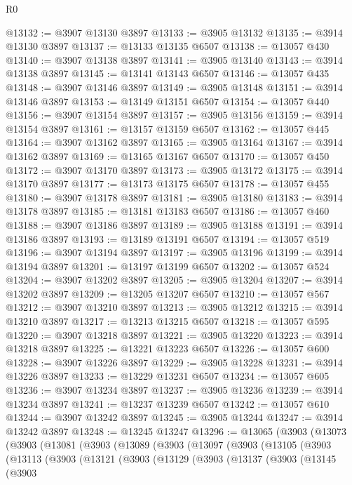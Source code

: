 \begin{lexlean}{R0}
\begin{coremodule}
@13132 := @3907 @13130 @3897
@13133 := @3905 @13132
@13135 := @3914 @13130 @3897
@13137 := @13133 @13135 @6507
@13138 := @13057 @430
@13140 := @3907 @13138 @3897
@13141 := @3905 @13140
@13143 := @3914 @13138 @3897
@13145 := @13141 @13143 @6507
@13146 := @13057 @435
@13148 := @3907 @13146 @3897
@13149 := @3905 @13148
@13151 := @3914 @13146 @3897
@13153 := @13149 @13151 @6507
@13154 := @13057 @440
@13156 := @3907 @13154 @3897
@13157 := @3905 @13156
@13159 := @3914 @13154 @3897
@13161 := @13157 @13159 @6507
@13162 := @13057 @445
@13164 := @3907 @13162 @3897
@13165 := @3905 @13164
@13167 := @3914 @13162 @3897
@13169 := @13165 @13167 @6507
@13170 := @13057 @450
@13172 := @3907 @13170 @3897
@13173 := @3905 @13172
@13175 := @3914 @13170 @3897
@13177 := @13173 @13175 @6507
@13178 := @13057 @455
@13180 := @3907 @13178 @3897
@13181 := @3905 @13180
@13183 := @3914 @13178 @3897
@13185 := @13181 @13183 @6507
@13186 := @13057 @460
@13188 := @3907 @13186 @3897
@13189 := @3905 @13188
@13191 := @3914 @13186 @3897
@13193 := @13189 @13191 @6507
@13194 := @13057 @519
@13196 := @3907 @13194 @3897
@13197 := @3905 @13196
@13199 := @3914 @13194 @3897
@13201 := @13197 @13199 @6507
@13202 := @13057 @524
@13204 := @3907 @13202 @3897
@13205 := @3905 @13204
@13207 := @3914 @13202 @3897
@13209 := @13205 @13207 @6507
@13210 := @13057 @567
@13212 := @3907 @13210 @3897
@13213 := @3905 @13212
@13215 := @3914 @13210 @3897
@13217 := @13213 @13215 @6507
@13218 := @13057 @595
@13220 := @3907 @13218 @3897
@13221 := @3905 @13220
@13223 := @3914 @13218 @3897
@13225 := @13221 @13223 @6507
@13226 := @13057 @600
@13228 := @3907 @13226 @3897
@13229 := @3905 @13228
@13231 := @3914 @13226 @3897
@13233 := @13229 @13231 @6507
@13234 := @13057 @605
@13236 := @3907 @13234 @3897
@13237 := @3905 @13236
@13239 := @3914 @13234 @3897
@13241 := @13237 @13239 @6507
@13242 := @13057 @610
@13244 := @3907 @13242 @3897
@13245 := @3905 @13244
@13247 := @3914 @13242 @3897
@13248 := @13245 @13247
@13296 := @13065
    (@3903
      (@13073
        (@3903
          (@13081
            (@3903
              (@13089
                (@3903
                  (@13097
                    (@3903
                      (@13105
                        (@3903
                          (@13113
                            (@3903
                              (@13121
                                (@3903
                                  (@13129
                                    (@3903
                                      (@13137
                                        (@3903
                                          (@13145
                                            (@3903

\end{coremodule}
\end{lexlean}
